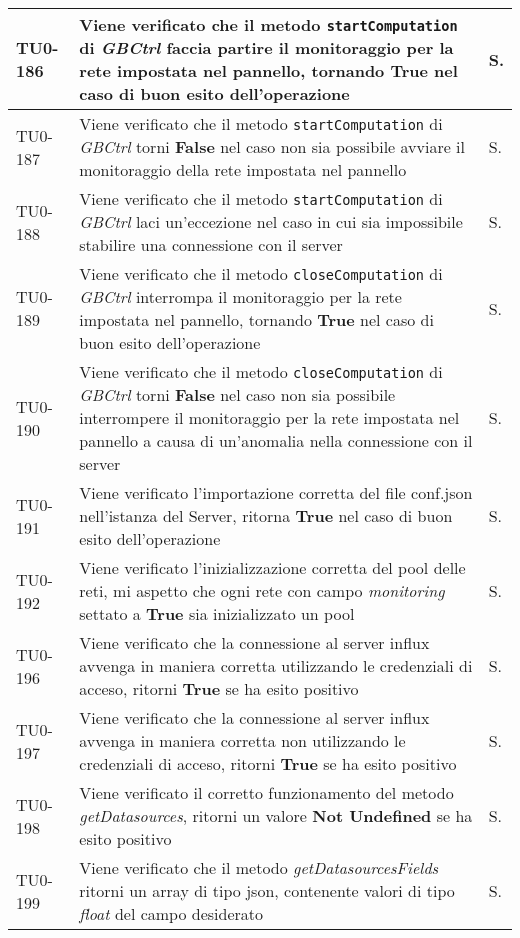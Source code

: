 \begin{longtable}{|C{.15\textwidth}|m{.66\textwidth}|C{.10\textwidth}|}
\hline
TU0-186 & Viene verificato che il metodo \texttt{startComputation} di \textit{GBCtrl} faccia partire il monitoraggio per la rete impostata nel pannello, tornando \textbf{True} nel caso di buon esito dell'operazione & S.\\
\hline
{}TU0-187 & Viene verificato che il metodo \texttt{startComputation} di \textit{GBCtrl} torni \textbf{False} nel caso non sia possibile avviare il monitoraggio della rete impostata nel pannello & S.\\
\hline
TU0-188 & Viene verificato che il metodo \texttt{startComputation} di \textit{GBCtrl} laci un'eccezione nel caso in cui sia impossibile stabilire una connessione con il server & S.\\
\hline
{}TU0-189 & Viene verificato che il metodo \texttt{closeComputation} di \textit{GBCtrl} interrompa il monitoraggio per la rete impostata nel pannello, tornando \textbf{True} nel caso di buon esito dell'operazione & S.\\
\hline
TU0-190 & Viene verificato che il metodo \texttt{closeComputation} di \textit{GBCtrl} torni \textbf{False} nel caso non sia possibile interrompere il monitoraggio per la rete impostata nel pannello a causa di un'anomalia nella connessione con il server & S.\\
\hline
{}TU0-191 & Viene verificato l'importazione corretta del file conf.json nell'istanza del Server, ritorna \textbf{True} nel caso di buon esito dell'operazione & S.\\
\hline
TU0-192 & Viene verificato l'inizializzazione corretta del pool delle reti, mi aspetto che ogni rete con campo \textit{monitoring} settato a \textbf{True} sia inizializzato un pool & S.\\
\hline
{}TU0-196 & Viene verificato che la connessione al server influx avvenga in maniera corretta utilizzando le credenziali di acceso, ritorni \textbf{True} se ha esito positivo & S.\\
\hline
TU0-197 & Viene verificato che la connessione al server influx avvenga in maniera corretta non utilizzando le credenziali di acceso, ritorni \textbf{True} se ha esito positivo & S.\\
\hline
{}TU0-198 & Viene verificato il corretto funzionamento del metodo \textit{getDatasources}, ritorni un valore \textbf{Not Undefined} se ha esito positivo & S.\\
\hline
TU0-199 & Viene verificato che il metodo \textit{getDatasourcesFields} ritorni un array di tipo json, contenente valori di tipo \textit{float} del campo desiderato & S.\\

\end{longtable}

